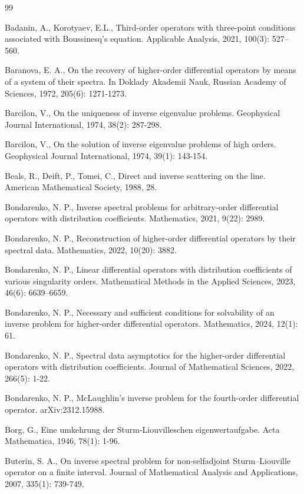 \documentclass[reqno,12pt,centertags]{amsart}
\numberwithin{equation}{section}
\theoremstyle{definition}
\begin{document}
\begin{thebibliography}{99}

Badanin, A., Korotyaev, E.L., Third-order operators with three-point conditions associated
with Boussinesq’s equation. Applicable Analysis, 2021, 100(3): 527–560.

 Baranova, E. A., On the recovery of higher-order differential operators by means of a system of their spectra. In Doklady Akademii Nauk, Russian Academy of Sciences, 1972, 205(6): 1271-1273.

 Barcilon, V., On the uniqueness of inverse eigenvalue problems. Geophysical Journal International, 1974, 38(2): 287-298.

 Barcilon, V., On the solution of inverse eigenvalue problems of high orders. Geophysical Journal International, 1974, 39(1): 143-154.

Beals, R., Deift, P., Tomei, C.,  Direct and inverse scattering on the line. American Mathematical Society, 1988, 28.

 Bondarenko, N. P., Inverse spectral problems for arbitrary-order differential operators with distribution coefficients. Mathematics, 2021, 9(22): 2989. 

 Bondarenko, N. P., Reconstruction of higher-order differential operators by their spectral data. Mathematics, 2022, 10(20): 3882. 

 Bondarenko, N. P., Linear differential operators with distribution coefficients of various singularity orders. Mathematical Methods in the Applied Sciences, 2023, 46(6): 6639–6659.

 Bondarenko, N. P., Necessary and sufficient conditions for solvability of an inverse problem for higher-order differential operators. Mathematics, 2024, 12(1): 61.

 Bondarenko, N. P., Spectral data asymptotics for the higher-order differential operators with distribution coefficients. Journal of Mathematical Sciences, 2022, 266(5): 1-22.

 Bondarenko, N. P., McLaughlin's inverse problem for the fourth-order differential operator. arXiv:2312.15988.

 Borg, G., Eine umkehrung der Sturm-Liouvilleschen eigenwertaufgabe. Acta Mathematica, 1946, 78(1): 1-96.

 Buterin, S. A., On inverse spectral problem for non-selfadjoint Sturm–Liouville operator on a finite interval. Journal of Mathematical Analysis and Applications, 2007, 335(1): 739-749.


\end{thebibliography}
\end{document}
